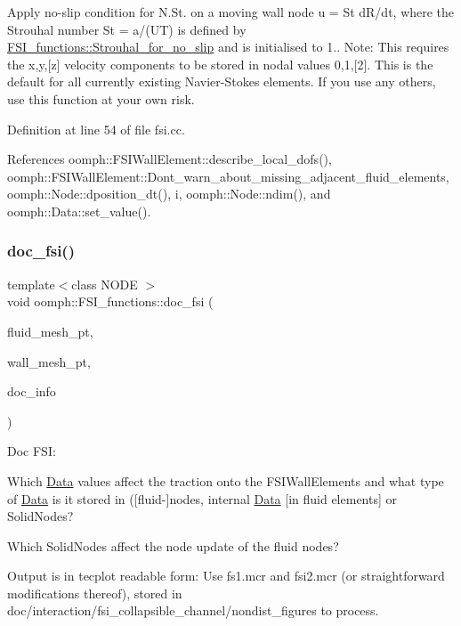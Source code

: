 Apply no-\/slip condition for N.\+St. on a moving wall node u = St d\+R/dt, where the Strouhal number St = a/(UT) is defined by \hyperlink{namespaceoomph_1_1FSI__functions_aa213854665524b0720b63a115ef57fd8}{F\+S\+I\+\_\+functions\+::\+Strouhal\+\_\+for\+\_\+no\+\_\+slip} and is initialised to 1.. Note\+: This requires the x,y,\mbox{[}z\mbox{]} velocity components to be stored in nodal values 0,1,\mbox{[}2\mbox{]}. This is the default for all currently existing Navier-\/\+Stokes elements. If you use any others, use this function at your own risk. 

Definition at line 54 of file fsi.\+cc.



References oomph\+::\+F\+S\+I\+Wall\+Element\+::describe\+\_\+local\+\_\+dofs(), oomph\+::\+F\+S\+I\+Wall\+Element\+::\+Dont\+\_\+warn\+\_\+about\+\_\+missing\+\_\+adjacent\+\_\+fluid\+\_\+elements, oomph\+::\+Node\+::dposition\+\_\+dt(), i, oomph\+::\+Node\+::ndim(), and oomph\+::\+Data\+::set\+\_\+value().

\mbox{\label{namespaceoomph_1_1FSI__functions_afc4e716b0325ab47465bd6c312c829fe}} 
\subsubsection{\texorpdfstring{doc\+\_\+fsi()}{doc\_fsi()}}
{\footnotesize\ttfamily template$<$class N\+O\+DE $>$ \\
void oomph\+::\+F\+S\+I\+\_\+functions\+::doc\+\_\+fsi (\begin{DoxyParamCaption}\item[{\hyperlink{classoomph_1_1Mesh}{Mesh} $\ast$}]{fluid\+\_\+mesh\+\_\+pt,  }\item[{\hyperlink{classoomph_1_1SolidMesh}{Solid\+Mesh} $\ast$}]{wall\+\_\+mesh\+\_\+pt,  }\item[{\hyperlink{classoomph_1_1DocInfo}{Doc\+Info} \&}]{doc\+\_\+info }\end{DoxyParamCaption})}

Doc F\+SI\+:
\begin{DoxyEnumerate}
\item Which \hyperlink{classoomph_1_1Data}{Data} values affect the traction onto the F\+S\+I\+Wall\+Elements and what type of \hyperlink{classoomph_1_1Data}{Data} is it stored in (\mbox{[}fluid-\/\mbox{]}nodes, internal \hyperlink{classoomph_1_1Data}{Data} \mbox{[}in fluid elements\mbox{]} or Solid\+Nodes?
\item Which Solid\+Nodes affect the node update of the fluid nodes?
\end{DoxyEnumerate}Output is in tecplot readable form\+: Use fs1.\+mcr and fsi2.\+mcr (or straightforward modifications thereof), stored in doc/interaction/fsi\+\_\+collapsible\+\_\+channel/nondist\+\_\+figures to process.

